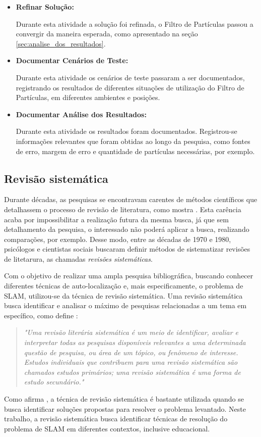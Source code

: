 \begin{itemize}
\item \textbf{Refinar Solução:}

Durante esta atividade a solução foi refinada, o Filtro de Partículas passou a convergir da maneira esperada, como apresentado na seção
\ref{sec:analise_dos_resultados}.

\item \textbf{Documentar Cenários de Teste:}

Durante esta atividade os cenários de teste passaram a ser documentados, registrando os resultados de diferentes situações de utilização
do Filtro de Partículas, em diferentes ambientes e posições.

\item \textbf{Documentar Análise dos Resultados:}

Durante esta atividade os resultados foram documentados. Registrou-se informações relevantes que foram obtidas ao longo da pesquisa, como
fontes de erro, margem de erro e quantidade de partículas necessárias, por exemplo.

\end{itemize}

\subsection{Revisão sistemática} %
\label{sec:revisao_sistematica}

	Durante décadas, as pesquisas se encontravam carentes de métodos científicos que detalhassem o processo de revisão de literatura, como mostra \cite{Kitchenham}. Esta carência acaba por impossibilitar a realização futura da mesma busca, já que sem detalhamento da pesquisa, o interessado não poderá aplicar a busca, realizando comparações, por exemplo. Desse modo, entre as décadas de 1970 e 1980, psicólogos e cientistas sociais buscaram definir métodos de sistematizar revisões de litetarura, as chamadas \textit{revisões sistemáticas}.

	Com o objetivo de realizar uma ampla pesquisa bibliográfica, buscando conhecer diferentes técnicas de auto-localização e, mais especificamente, o problema de SLAM, utilizou-se da técnica de revisão sistemática. Uma revisão sistemática busca identificar e analisar o máximo de pesquisas relacionadas a um tema em específico, como define \cite[p. 8]{revisaoSistematicaComunicacao}:
	 \begin{quote}
	 	\textit{"Uma revisão literária sistemática é um meio de identificar, avaliar e interpretar
		todas as pesquisas disponíveis relevantes a uma determinada questão de pesquisa,
		ou área de um tópico, ou fenômeno de interesse. Estudos individuais que contribuem
		para uma revisão sistemática são chamados estudos primários; uma revisão
		sistemática é uma forma de estudo secundário."}
	 \end{quote}
	 Como afirma \cite{revisaoSistematicaComunicacao}, a técnica de revisão sistemática é bastante utilizada quando se busca identificar soluções propostas para resolver o problema levantado. Neste trabalho, a revisão sistemática busca identificar técnicas de resolução do problema de SLAM em diferentes contextos, inclusive educacional.

